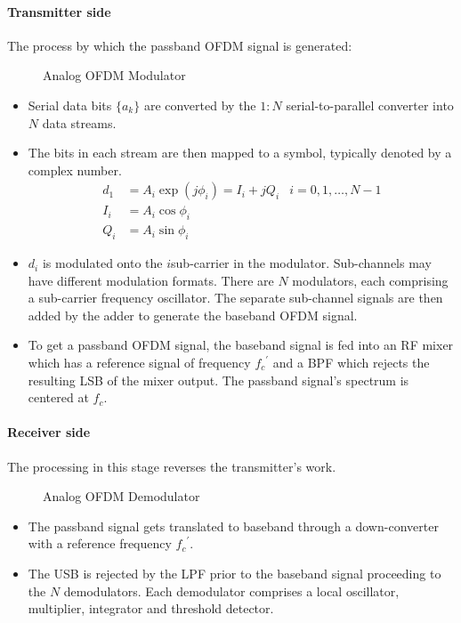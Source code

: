 \paragraph{Transmitter side} The process by which the passband OFDM signal is generated:
\begin{figure}[!h]
	\centering
	\resizebox{\textwidth}{!}{
		
	}
	\caption{Analog OFDM Modulator}
\end{figure}
\begin{itemize}
	\item Serial data bits \(\{a_k\}\) are converted by the \(1:N\) serial-to-parallel converter into \(N\) data streams.
	\item The bits in each stream are then mapped to a symbol, typically denoted by a complex number.
		\begin{align*}
			d_1 &= A_i \exp (j\phi_i) = I_i + jQ_i & i = 0,1,\ldots, N-1 \\
			I_i &= A_i \cos \phi_i \\
			Q_i &= A_i \sin \phi_i
		\end{align*}
		\begin{mathDef}
		\end{mathDef}
	\item \(d_i\) is modulated onto the \(i\)\nth sub-carrier in the modulator. Sub-channels may have different modulation formats. There are \(N\) modulators, each comprising a sub-carrier frequency oscillator. The separate sub-channel signals are then added by the adder to generate the baseband OFDM signal.
	\item To get a passband OFDM signal, the baseband signal is fed into an RF mixer which has a reference signal of frequency \({f_c}^\prime\) and a \gls{BPF} which rejects the resulting \gls{LSB} of the mixer output. The passband signal's spectrum is centered at \(f_c\).
\end{itemize}

\paragraph{Receiver side} The processing in this stage reverses the transmitter's work\cite{ofdm_intro}.
\begin{figure}[!h]
	\centering
	\resizebox{\textwidth}{!}{
		
	}
	\caption{Analog OFDM Demodulator}
\end{figure}
\begin{itemize}
	\item The passband signal gets translated to baseband through a down-converter with a reference frequency \({f_c}^\prime\).
	\item The \gls{USB} is rejected by the \gls{LPF} prior to the baseband signal proceeding to the \(N\) demodulators. Each demodulator comprises a local oscillator, multiplier, integrator and threshold detector.
\end{itemize}

